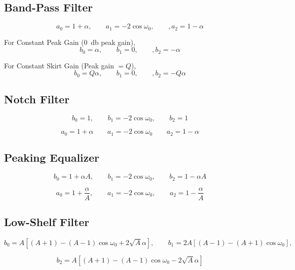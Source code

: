 \subsection{Band-Pass Filter}
$$
a_0=1+\alpha, \qquad  a_1=-2\cos\omega_0, \qquad, a_2=1-\alpha
$$

For Constant Peak Gain (\SI{0}{\decibel} peak gain), 
$$
b_0=\alpha, \qquad  b_1=0, \qquad, b_2=-\alpha
$$

For Constant Skirt Gain (Peak gain $= Q$), 
$$
b_0=Q\alpha, \qquad  b_1=0, \qquad, b_2=-Q\alpha
$$



\subsection{Notch Filter}
$$
b_0=1, \qquad  b_1=-2\cos\omega_0, \qquad  b_2=1
$$

$$
a_0=1+\alpha  \qquad  a_1=-2\cos\omega_0  \qquad a_2=1-\alpha
$$



\subsection{Peaking Equalizer}
$$
b_0=1+\alpha A, \qquad b_1=-2\cos\omega_0, \qquad b_2=1-\alpha A
$$

$$
a_0=1+\frac{\alpha}{A}, \qquad a_1=-2\cos\omega_0, \qquad a_2=1-\frac{\alpha}{A}
$$



\subsection{Low-Shelf Filter}
$$
b_0=A\left[(A+1)-(A-1)\cos\omega_0+2\sqrt{A}\alpha\right], \qquad
b_1=2A\left[(A-1)-(A+1)\cos\omega_0\right], \qquad
$$

$$
b_2=A\left[(A+1)-(A-1)\cos\omega_0-2\sqrt{A}\alpha\right]
$$

